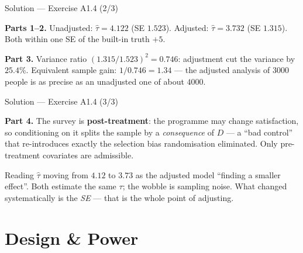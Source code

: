 \documentclass[aspectratio=169,11pt]{beamer}
\begin{document}
\begin{frame}{Solution --- Exercise A1.4 (2/3)}
\begin{solutionbox}
  \textbf{Parts 1--2.} Unadjusted: $\hat\tau = 4.122$ (SE $1.523$). Adjusted:
  $\hat\tau = 3.732$ (SE $1.315$). Both within one SE of the built-in truth $+5$.

  \smallskip
  \textbf{Part 3.} Variance ratio $(1.315/1.523)^2 = 0.746$: adjustment cut the variance
  by $25.4\%$. Equivalent sample gain: $1/0.746 = 1.34$ --- the adjusted analysis of
  $3000$ people is as precise as an unadjusted one of about $4000$.
\end{solutionbox}
\end{frame}

\begin{frame}{Solution --- Exercise A1.4 (3/3)}
\begin{solutionbox}
  \smallskip
  \textbf{Part 4.} The survey is \textbf{post-treatment}: the programme may change
  satisfaction, so conditioning on it splits the sample by a \emph{consequence} of $D$
  --- a ``bad control'' that re-introduces exactly the selection bias randomisation
  eliminated. Only pre-treatment covariates are admissible.
\end{solutionbox}
\begin{mistake}
  Reading $\hat\tau$ moving from $4.12$ to $3.73$ as the adjusted model ``finding a
  smaller effect''. Both estimate the same $\tau$; the wobble is sampling noise. What
  changed systematically is the \emph{SE} --- that is the whole point of adjusting.
\end{mistake}
\end{frame}

\section{Design \& Power}
\end{document}
